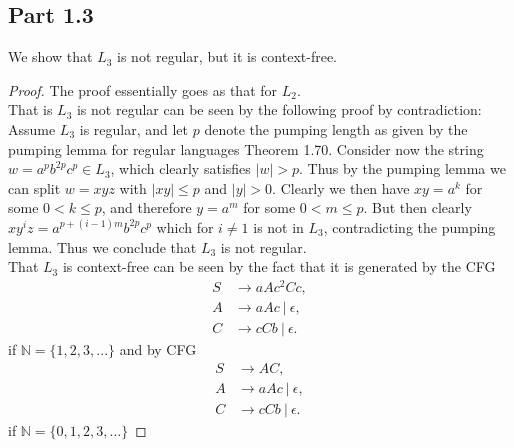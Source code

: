 \documentclass[a4paper,11pt]{article}
\newcommand{\abs}[1]{\left\lvert #1 \right\rvert}
\newcommand{\N}{\mathbb{N}}
\newcommand{\pipe}{\ \vert \ }
\numberwithin{equation}{section}
\begin{document}
	\subsection*{Part 1.3}
	We show that $ L_3 $ is not regular, but it is context-free.
	\begin{proof}
		The proof essentially goes as that for $ L_2 $. \\
		That is $ L_3 $ is not regular can be seen by the following proof by contradiction: Assume $ L_3 $ is regular, and let $ p $ denote the pumping length as given by the pumping lemma for regular languages Theorem 1.70. Consider now the string $ w=a^pb^{2p}c^{p}\in L_3 $, which clearly satisfies $ \abs{w}>p $. Thus by the pumping lemma we can split $ w=xyz $ with $ \abs{xy}\leq p $ and $ \abs{y}>0 $. Clearly we then have $ xy=a^k $ for some $ 0<k\leq p $, and therefore $ y=a^m $ for some $ 0<m\leq p $. But then clearly $ xy^iz=a^{p+(i-1)m}b^{2p}c^{p} $ which for $ i\neq 1 $ is not in $ L_3 $, contradicting the pumping lemma. Thus we conclude that $ L_3 $ is not regular. \\
		That $ L_3 $ is context-free can be seen by the fact that it is generated by the CFG
		\begin{equation*}
		\begin{aligned}
		S&\to aAc^2Cc,\\
		A&\to aAc\pipe \epsilon,\\
		C&\to cCb\pipe\epsilon.
		\end{aligned}
		\end{equation*}
		if $ \N=\{1,2,3,...\} $ and by CFG
		\begin{equation*}
		\begin{aligned}
		S&\to AC,\\
		A&\to aAc\pipe \epsilon,\\
		C&\to cCb\pipe\epsilon.
		\end{aligned}
		\end{equation*}
		if $ \N=\{0,1,2,3,...\} $
	\end{proof}
\end{document}
